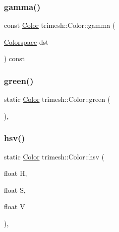 \mbox{\label{classtrimesh_1_1Color_aed131184642ab0047a27cc5b5b305acd}} 
\subsubsection{\texorpdfstring{gamma()}{gamma()}\hspace{0.1cm}{\footnotesize\ttfamily [2/2]}}
{\footnotesize\ttfamily const \hyperlink{classtrimesh_1_1Color}{Color} trimesh\+::\+Color\+::gamma (\begin{DoxyParamCaption}\item[{\hyperlink{classtrimesh_1_1Color_a2e472a2f6056fb5d0d835ee1c361b6da}{Colorspace}}]{dst }\end{DoxyParamCaption}) const\hspace{0.3cm}{\ttfamily [inline]}}

\mbox{\label{classtrimesh_1_1Color_ae17448b9f7642601460d2e54e7f83905}} 
\subsubsection{\texorpdfstring{green()}{green()}}
{\footnotesize\ttfamily static \hyperlink{classtrimesh_1_1Color}{Color} trimesh\+::\+Color\+::green (\begin{DoxyParamCaption}{ }\end{DoxyParamCaption})\hspace{0.3cm}{\ttfamily [inline]}, {\ttfamily [static]}}

\mbox{\label{classtrimesh_1_1Color_a609b459d8e1ded6dd6d985ddfc0a68db}} 
\subsubsection{\texorpdfstring{hsv()}{hsv()}}
{\footnotesize\ttfamily static \hyperlink{classtrimesh_1_1Color}{Color} trimesh\+::\+Color\+::hsv (\begin{DoxyParamCaption}\item[{float}]{H,  }\item[{float}]{S,  }\item[{float}]{V }\end{DoxyParamCaption})\hspace{0.3cm}{\ttfamily [inline]}, {\ttfamily [static]}}



